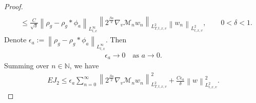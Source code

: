 \documentclass[11pt,american, reqno]{amsart}
\numberwithin{equation}{section}
\newcommand{\N}{\mathbb N}
\newcommand{\1}{\mathds{1}}
\newcommand{\CalM}{\mathcal{M}}
\newcommand{\Eps}{\epsilon}
\newcommand{\norm}[1]{\left\lVert#1\right\rVert}
\numberwithin{equation}{section}
\begin{document}
\begin{proof}
\begin{align}
\\
& \leq 
  \frac{C}{\sqrt{\delta}}\norm{\rho_g - \rho_g \ast \phi_a}_{L^\infty_{t,x}}
 \norm{2^{\frac{\beta n}{2}}\nabla_v \CalM_n w_n}_{L^2_{T,t,x,v}}
 \norm{w_n}_{L^2_{t,x,v}},
\qquad
 0 < \delta < 1.
\end{align}
Denote $\Eps_a
:= \norm{\rho_g - \rho_g \ast \phi_a}_{L^\infty_{t,x}}$.
Then
\begin{align*}
 \Eps_a \to 0
\quad \text{as} \,\,
a \to 0.
\end{align*}
Summing over $n \in \N$, we have
\begin{align} \label{est:EJ-2}
 EJ_2
\leq 
 \Eps_a \sum_{n=0}^\infty
 \norm{2^{\frac{\beta n}{2}} \nabla_v \CalM_n w_n}_{L^2_{T,t,x,v}}^2
+ \frac{C \Eps_a}{\delta}
  \norm{w}_{L^2_{t,x,v}}^2.
\end{align}



\end{proof}
\end{document}
